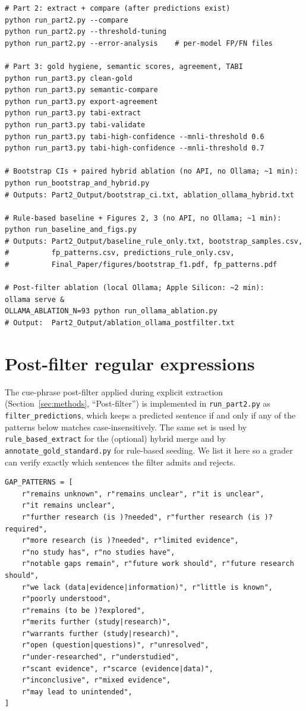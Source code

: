 \documentclass{article}
\begin{document}
\begin{verbatim}
# Part 2: extract + compare (after predictions exist)
python run_part2.py --compare
python run_part2.py --threshold-tuning
python run_part2.py --error-analysis    # per-model FP/FN files

# Part 3: gold hygiene, semantic scores, agreement, TABI
python run_part3.py clean-gold
python run_part3.py semantic-compare
python run_part3.py export-agreement
python run_part3.py tabi-extract
python run_part3.py tabi-validate
python run_part3.py tabi-high-confidence --mnli-threshold 0.6
python run_part3.py tabi-high-confidence --mnli-threshold 0.7

# Bootstrap CIs + paired hybrid ablation (no API, no Ollama; ~1 min):
python run_bootstrap_and_hybrid.py
# Outputs: Part2_Output/bootstrap_ci.txt, ablation_ollama_hybrid.txt

# Rule-based baseline + Figures 2, 3 (no API, no Ollama; ~1 min):
python run_baseline_and_figs.py
# Outputs: Part2_Output/baseline_rule_only.txt, bootstrap_samples.csv,
#          fp_patterns.csv, predictions_rule_only.csv,
#          Final_Paper/figures/bootstrap_f1.pdf, fp_patterns.pdf

# Post-filter ablation (local Ollama; Apple Silicon: ~2 min):
ollama serve &
OLLAMA_ABLATION_N=93 python run_ollama_ablation.py
# Output:  Part2_Output/ablation_ollama_postfilter.txt
\end{verbatim}

\section{Post-filter regular expressions}
\label{app:postfilter}
\noindent The cue-phrase post-filter applied during explicit extraction (Section~\ref{sec:methods}, ``Post-filter'') is implemented in \texttt{run\_part2.py} as \texttt{filter\_predictions}, which keeps a predicted sentence if and only if any of the patterns below matches case-insensitively. The same set is used by \texttt{rule\_based\_extract} for the (optional) hybrid merge and by \texttt{annotate\_gold\_standard.py} for rule-based seeding. We list it here so a grader can verify exactly which sentences the filter admits and rejects.

\begin{verbatim}
GAP_PATTERNS = [
    r"remains unknown", r"remains unclear", r"it is unclear",
    r"it remains unclear",
    r"further research (is )?needed", r"further research (is )?required",
    r"more research (is )?needed", r"limited evidence",
    r"no study has", r"no studies have",
    r"notable gaps remain", r"future work should", r"future research should",
    r"we lack (data|evidence|information)", r"little is known",
    r"poorly understood",
    r"remains (to be )?explored",
    r"merits further (study|research)",
    r"warrants further (study|research)",
    r"open (question|questions)", r"unresolved",
    r"under-researched", r"understudied",
    r"scant evidence", r"scarce (evidence|data)",
    r"inconclusive", r"mixed evidence",
    r"may lead to unintended",
]
\end{verbatim}
\end{document}
